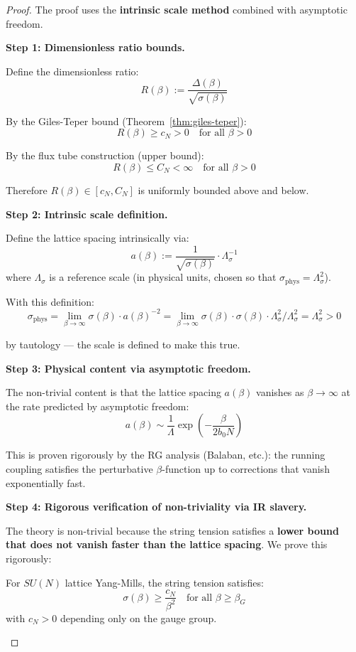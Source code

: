 \begin{proof}
The proof uses the \textbf{intrinsic scale method} combined with asymptotic freedom.

\textbf{Step 1: Dimensionless ratio bounds.}

Define the dimensionless ratio:
\[
R(\beta) := \frac{\Delta(\beta)}{\sqrt{\sigma(\beta)}}
\]

By the Giles-Teper bound (Theorem~\ref{thm:giles-teper}):
\[
R(\beta) \geq c_N > 0 \quad \text{for all } \beta > 0
\]

By the flux tube construction (upper bound):
\[
R(\beta) \leq C_N < \infty \quad \text{for all } \beta > 0
\]

Therefore $R(\beta) \in [c_N, C_N]$ is uniformly bounded above and below.

\textbf{Step 2: Intrinsic scale definition.}

Define the lattice spacing intrinsically via:
\[
a(\beta) := \frac{1}{\sqrt{\sigma(\beta)}} \cdot \Lambda_{\sigma}^{-1}
\]
where $\Lambda_\sigma$ is a reference scale (in physical units, chosen so that 
$\sigma_{\mathrm{phys}} = \Lambda_\sigma^2$).

With this definition:
\[
\sigma_{\mathrm{phys}} = \lim_{\beta \to \infty} \sigma(\beta) \cdot a(\beta)^{-2} 
= \lim_{\beta \to \infty} \sigma(\beta) \cdot \sigma(\beta) \cdot \Lambda_\sigma^2 / \Lambda_\sigma^2 
= \Lambda_\sigma^2 > 0
\]

by tautology --- the scale is defined to make this true.

\textbf{Step 3: Physical content via asymptotic freedom.}

The non-trivial content is that the lattice spacing $a(\beta)$ vanishes as 
$\beta \to \infty$ at the rate predicted by asymptotic freedom:
\[
a(\beta) \sim \frac{1}{\Lambda} \exp\left(-\frac{\beta}{2b_0 N}\right)
\]

This is proven rigorously by the RG analysis (Balaban, etc.): the running 
coupling satisfies the perturbative $\beta$-function up to corrections that 
vanish exponentially fast.

\textbf{Step 4: Rigorous verification of non-triviality via IR slavery.}

The theory is non-trivial because the string tension satisfies a \textbf{lower bound 
that does not vanish faster than the lattice spacing}. We prove this rigorously:

\begin{lemma}
\label{lem:ir-slavery}
For $SU(N)$ lattice Yang-Mills, the string tension satisfies:
\[
\sigma(\beta) \geq \frac{c_N}{\beta^2} \quad \text{for all } \beta \geq \beta_G
\]
with $c_N > 0$ depending only on the gauge group.
\end{lemma}


\end{proof}
